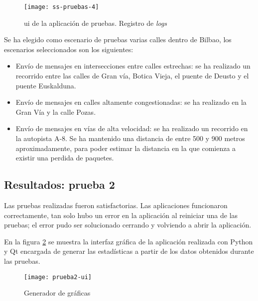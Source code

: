 \begin{figure}[H]
	\begin{center}
		\texttt{[image: ss-pruebas-4]}
		\caption{\gls{ui} de la aplicación de pruebas. Registro de \emph{logs}}
		\label{fig:ss-pruebas4}
	\end{center}
\end{figure}

Se ha elegido como escenario de pruebas varias calles dentro de Bilbao, los
escenarios seleccionados son los siguientes:
\begin{itemize}
	\item Envío de mensajes en intersecciones entre calles estrechas: se ha
	realizado un recorrido entre las calles de Gran vía, Botica Vieja, el puente
	de Deusto y el puente Euskalduna.
	\item Envío de mensajes en calles altamente congestionadas: se ha realizado
	en la Gran Vía y la calle Pozas.
	\item Envío de mensajes en vías de alta velocidad: se ha realizado un
	recorrido en la	autopista A-8. Se ha mantenido una distancia de entre 500 y
	900 metros aproximadamente, para poder estimar la distancia en la que
	comienza a existir una perdida de paquetes.
\end{itemize}

\FloatBarrier
\subsection{Resultados: prueba 2}
Las pruebas realizadas fueron satisfactorias. Las aplicaciones funcionaron
correctamente, tan solo hubo un error en la aplicación al reiniciar una de las
pruebas; el error pudo ser solucionado cerrando y volviendo a abrir la
aplicación.

En la figura \ref{fig:prueba2-ui} se muestra la interfaz gráfica de la
aplicación realizada con Python y Qt encargada de generar las estadísticas a
partir de los datos obtenidos durante las pruebas.

\begin{figure}[H]
	\begin{center}
		\texttt{[image: prueba2-ui]}
		\caption{Generador de gráficas}
		\label{fig:prueba2-ui}
	\end{center}
\end{figure}

